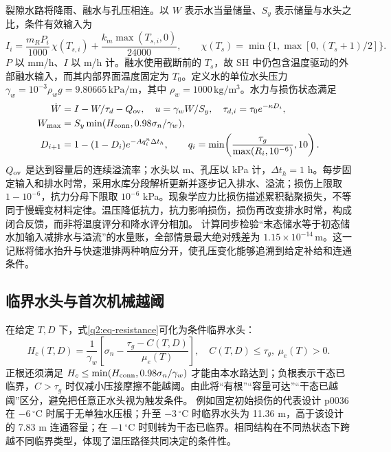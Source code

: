 裂隙水路将降雨、融水与孔压相连\cite{q2-benasher2026}。以 $W$ 表示水当量储量、$S_y$ 表示储量与水头之比，条件有效输入为
\begin{equation}
 I_i=\frac{m_RP_i}{1000}\,\chi(T_{s,i})+
 \frac{k_m\max(T_{s,i},0)}{24000},\qquad
 \chi(T_s)=\min\{1,\max[0,(T_s+1)/2]\}.
 \label{q2:eq-inflow}
\end{equation}
$P$ 以 mm/h、$I$ 以 m/h 计。融水使用截断前的 $T_s$，故 SH 中仍包含温度驱动的外部融水输入，而其内部界面温度固定为 $T_0$。定义水的单位水头压力 $\gamma_w=10^{-3}\rho_wg=9.80665\,\mathrm{kPa/m}$，其中 $\rho_w=1000\,\mathrm{kg/m^3}$。水力与损伤状态满足
\begin{equation}
\begin{aligned}
 \dot W&=I-W/\tau_d-Q_{\rm ov},\quad
 u=\gamma_wW/S_y,\quad\tau_{d,i}=\tau_0e^{-\kappa D_i},\\
 W_{\max}&=S_y\min(H_{\rm conn},0.98\sigma_n/\gamma_w),\\
 D_{i+1}&=1-(1-D_i)e^{-Aq_i^n\Delta t_h},\qquad
 q_i=\min\!\left(\frac{\tau_g}{\max(R_i,10^{-6})},10\right).
\end{aligned}\label{q2:eq-states}
\end{equation}
$Q_{\rm ov}$ 是达到容量后的连续溢流率；水头以 m、孔压以 kPa 计，$\Delta t_h=1$ h。每步固定输入和排水时常，采用水库分段解析更新并逐步记入排水、溢流；损伤上限取 $1-10^{-6}$，抗力分母下限取 $10^{-6}$ kPa。现象学应力比损伤描述累积黏聚损失，不等同于慢蠕变材料定律。温压降低抗力，抗力影响损伤，损伤再改变排水时常，构成闭合反馈，而非将温度评分和降水评分相加。
计算同步检验“末态储水等于初态储水加输入减排水与溢流”的水量账，全部情景最大绝对残差为 $1.15\times10^{-14}\,\mathrm m$。这一记账将储水抬升与快速泄排两种响应分开，使孔压变化能够追溯到给定补给和连通条件。

\subsection{临界水头与首次机械越阈}\label{q2:sec-critical}

在给定 $T,D$ 下，式\eqref{q2:eq-resistance}可化为条件临界水头：
\begin{equation}
 H_c(T,D)=\frac{1}{\gamma_w}\left[\sigma_n-
 \frac{\tau_g-C(T,D)}{\mu_e(T)}\right],
 \quad C(T,D)\leq\tau_g,\ \mu_e(T)>0.
 \label{q2:eq-critical}
\end{equation}
正根还须满足 $H_c\leq\min(H_{\rm conn},0.98\sigma_n/\gamma_w)$ 才能由本水路达到；负根表示干态已临界，$C>\tau_g$ 时仅减小压接摩擦不能越阈。由此将“有根”“容量可达”“干态已越阈”区分，避免把任意正水头视为触发条件。
例如固定初始损伤的代表设计 p0036 在 $-6\,^{\circ}\mathrm C$ 时属于无单独水压根；升至 $-3\,^{\circ}\mathrm C$ 时临界水头为 11.36 m，高于该设计的 7.83 m 连通容量；在 $-1\,^{\circ}\mathrm C$ 时则转为干态已临界。相同结构在不同热状态下跨越不同临界类型，体现了温压路径共同决定的条件性。

